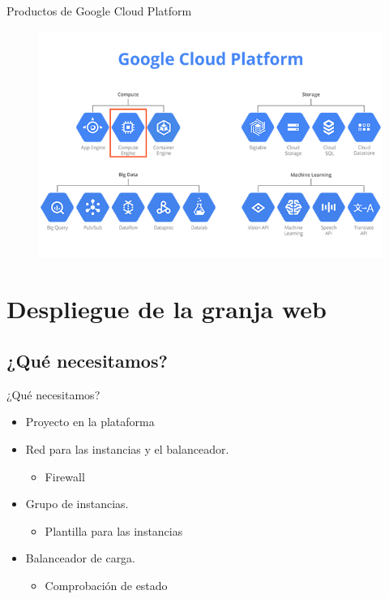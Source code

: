 \documentclass{beamer}
\begin{document}
\begin{frame}[fragile]{Productos de Google Cloud Platform}
\begin{figure}[H]
  \centering
  \includegraphics[width =\textwidth]{project/gcp_products_select.png}
\end{figure}
\end{frame}

\section{Despliegue de la granja web}

\subsection{¿Qué necesitamos?}

\begin{frame}[fragile]{¿Qué necesitamos?}
  \begin{itemize}[<+->]
    \item Proyecto en la plataforma
    \item Red para las instancias y el balanceador.
    \begin{itemize}[<+->]
      \item Firewall
    \end{itemize}
    \item Grupo de instancias.
    \begin{itemize}[<+->]
      \item Plantilla para las instancias
    \end{itemize}
    \item Balanceador de carga.
    \begin{itemize}[<+->]
      \item Comprobación de estado
    \end{itemize}
  \end{itemize}
\end{frame}
\end{document}
